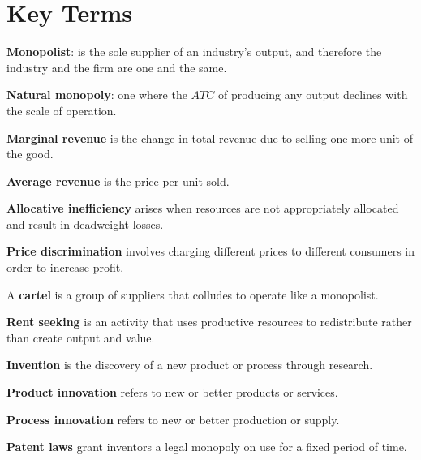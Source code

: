 \newpage
	\section*{Key Terms}
\begin{keyterms}
\textbf{Monopolist}: is the sole supplier of an industry's output, and therefore the industry and the firm are one and the same.

\textbf{Natural monopoly}: one where the $ATC$ of producing any output declines with the scale of operation.

\textbf{Marginal revenue} is the change in total revenue due to selling one more unit of the good.

\textbf{Average revenue} is the price per unit sold.

\textbf{Allocative inefficiency} arises when resources are not appropriately allocated and result in deadweight losses.

\textbf{Price discrimination} involves charging different prices to different consumers in order to increase profit.

A \textbf{cartel} is a group of suppliers that colludes to operate like a monopolist.

\textbf{Rent seeking} is an activity that uses productive resources to redistribute rather than create output and value.

\textbf{Invention} is the discovery of a new product or process through research.

\textbf{Product innovation} refers to new or better products or services.

\textbf{Process innovation} refers to new or better production or supply.

\textbf{Patent laws} grant inventors a legal monopoly on use for a fixed period of time.
\end{keyterms}